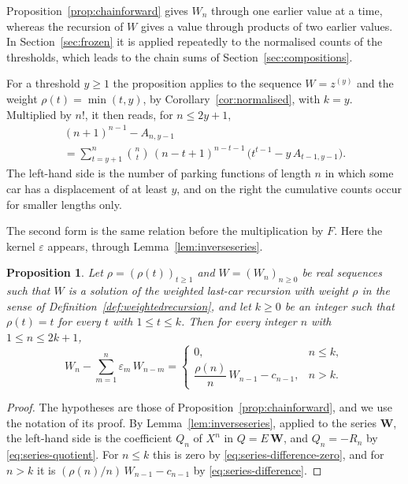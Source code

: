 \documentclass{amsart}
\newtheorem{proposition}[theorem]{Proposition}
\theoremstyle{definition}
\theoremstyle{remark}
\numberwithin{equation}{section}
\begin{document}
Proposition~\ref{prop:chainforward} gives $W_n$ through one earlier value at
a time, whereas the recursion of $W$ gives a value through products of two
earlier values. In Section~\ref{sec:frozen} it is applied repeatedly to the
normalised counts of the thresholds, which leads to the chain sums of
Section~\ref{sec:compositions}.

For a threshold $y\ge1$ the proposition applies to the sequence $W=z^{(y)}$
and the weight $\rho(t)=\min(t,y)$, by Corollary~\ref{cor:normalised}, with
$k=y$. Multiplied by $n!$, it then reads, for $n\le2y+1$,
\begin{multline*}
(n+1)^{n-1}-A_{n,y-1}\\
=\sum_{t=y+1}^{n}\binom nt\,(n-t+1)^{n-t-1}\,
\bigl(t^{t-1}-y\,A_{t-1,y-1}\bigr) .
\end{multline*}
The left-hand side is the number of parking functions of length $n$ in which
some car has a displacement of at least $y$, and on the right the cumulative
counts occur for smaller lengths only.

The second form is the same relation before the multiplication by $F$. Here
the kernel $\varepsilon$ appears, through Lemma~\ref{lem:inverseseries}.

\begin{proposition}\label{prop:chainquotient}
Let $\rho=(\rho(t))_{t\ge1}$ and $W=(W_n)_{n\ge0}$ be real sequences such
that $W$ is a solution of the weighted last-car recursion with weight $\rho$
in the sense of Definition~\ref{def:weightedrecursion}, and let $k\ge0$ be an
integer such that $\rho(t)=t$ for every $t$ with $1\le t\le k$. Then for
every integer $n$ with $1\le n\le2k+1$,
\[
W_n-\sum_{m=1}^{n}\varepsilon_m\,W_{n-m}=
\begin{cases}
0, & n\le k,\\[2pt]
\dfrac{\rho(n)}{n}\,W_{n-1}-c_{n-1}, & n>k.
\end{cases}
\]
\end{proposition}

\begin{proof}
The hypotheses are those of Proposition~\ref{prop:chainforward}, and we use
the notation of its proof. By Lemma~\ref{lem:inverseseries}, applied to the
series $\mathbf W$, the left-hand side is the coefficient $Q_n$ of $X^n$ in
$Q=E\,\mathbf W$, and $Q_n=-R_n$ by \eqref{eq:series-quotient}. For
$n\le k$ this is zero by \eqref{eq:series-difference-zero}, and for $n>k$ it
is $(\rho(n)/n)\,W_{n-1}-c_{n-1}$ by \eqref{eq:series-difference}.
\end{proof}
\end{document}
